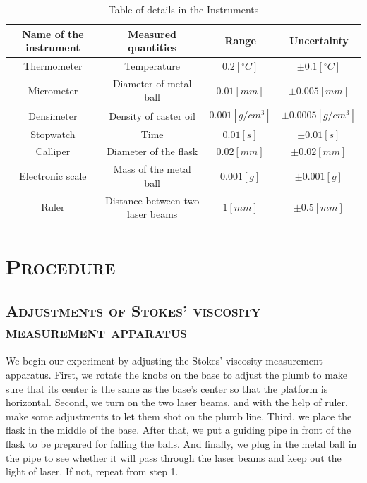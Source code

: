 \documentclass[a4paper,12pt]{article}
\begin{document}
\begin{table}[h]
\begin{center}
\begin{tabular}{cccc}
\hline
Name of the instrument & Measured quantities & Range & Uncertainty\\
\hline
Thermometer & Temperature & $0.2[^{\circ}C]$ & $\pm 0.1[^{\circ}C]$\\
Micrometer & Diameter of metal ball & $0.01 [mm]$ & $\pm 0.005 [mm]$\\
Densimeter & Density of caster oil & $0.001 [g/cm^3]$ & $\pm 0.0005 [g/cm^3]$\\
Stopwatch & Time & $0.01[s]$ & $\pm 0.01 [s]$\\
Calliper & Diameter of the flask & $0.02 [mm]$ & $\pm 0.02 [mm]$\\
Electronic scale & Mass of the metal ball & $0.001 [g]$ & $\pm 0.001 [g]$\\
Ruler & Distance between two laser beams & $1 [mm]$& $\pm 0.5 [mm]$\\
\hline
\end{tabular}
\end{center}
\caption{Table of details in the Instruments}
\end{table}


\section{\textsc{Procedure}}
\subsection{\textsc{Adjustments of Stokes’ viscosity measurement apparatus}}
We begin our experiment by adjusting the Stokes’ viscosity measurement apparatus. First, we rotate the knobs on the base to adjust the plumb to make sure that its center is the same as the base's center so that the platform is horizontal. Second, we turn on the two laser beams, and with the help of ruler, make some adjustments to let them shot on the plumb line. Third, we place the flask in the middle of the base. After that, we put a guiding pipe in front of the flask to be prepared for falling the balls. And finally, we plug in the metal ball in the pipe to see whether it will pass through the laser beams and keep out the light of laser. If not, repeat from step 1.
\end{document}
